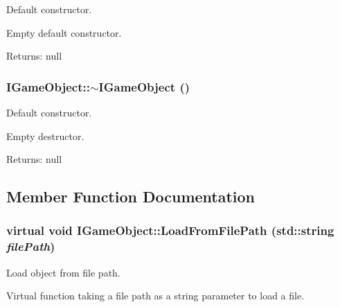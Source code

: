 Default constructor. 

Empty default constructor.

\begin{Desc}
\item[Returns:]null \end{Desc}
\hypertarget{class_i_game_object_4f66e595aac6c39352e89101c8e49ad5}{
\subsubsection[$\sim$IGameObject]{\setlength{\rightskip}{0pt plus 5cm}IGameObject::$\sim$IGameObject ()}}
\label{class_i_game_object_4f66e595aac6c39352e89101c8e49ad5}


Default constructor. 

Empty destructor.

\begin{Desc}
\item[Returns:]null \end{Desc}


\subsection{Member Function Documentation}
\hypertarget{class_i_game_object_10bf61ea34e19af52b45a117d32da934}{
\subsubsection[LoadFromFilePath]{\setlength{\rightskip}{0pt plus 5cm}virtual void IGameObject::LoadFromFilePath (std::string {\em filePath})}}
\label{class_i_game_object_10bf61ea34e19af52b45a117d32da934}


Load object from file path. 

Virtual function taking a file path as a string parameter to load a file.

